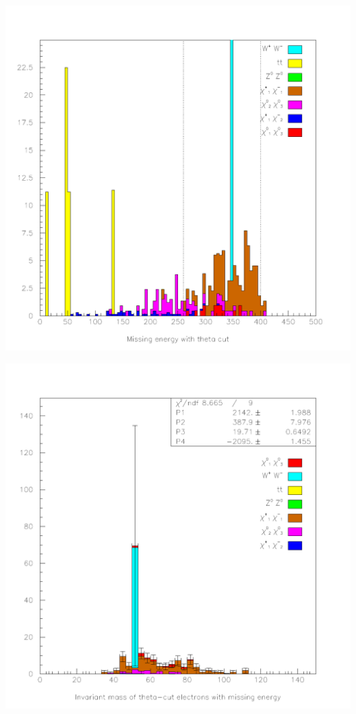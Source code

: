 \documentclass[landscape]{article}
\begin{document}
\begin{center} \includegraphics[height=0.8\textheight]{two_hours_5.pdf} \end{center}
\pagebreak

\begin{center} \includegraphics[height=0.8\textheight]{two_hours_6.pdf} \end{center}
\pagebreak
\end{document}
